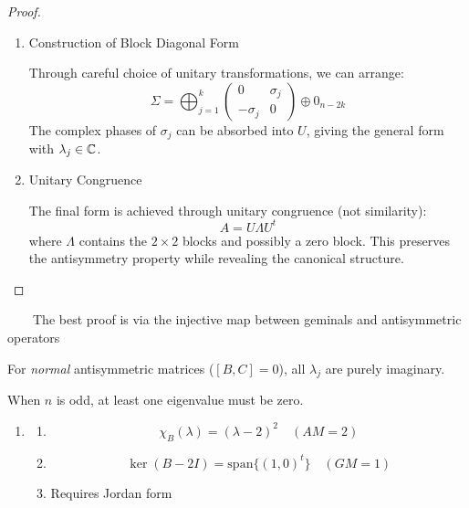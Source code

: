 \begin{theorem}
\begin{proof}
\begin{enumerate}
\item Construction of Block Diagonal Form

Through careful choice of unitary transformations, we can arrange: 
\begin{equation}
\Sigma =\bigoplus_{j=1}^{k}%
\begin{pmatrix}
0 & \sigma _{j} \\ 
-\sigma _{j} & 0%
\end{pmatrix}%
\oplus 0_{n-2k}
\end{equation}%
The complex phases of $\sigma _{j}$ can be absorbed into $U$, giving the
general form with $\lambda _{j}\in {\Bbb C}$.

\item Unitary Congruence

The final form is achieved through unitary congruence (not similarity): 
\begin{equation}
A=U\Lambda U^{t}
\end{equation}%
where $\Lambda $ contains the $2\times 2$ blocks and possibly a zero block.
This preserves the antisymmetry property while revealing the canonical
structure.
\end{enumerate}
\end{proof} $\qquad $The best proof is via the injective map between
geminals and antisymmetric operators
\end{theorem}

\begin{corollary}
For {\em normal} antisymmetric matrices ($[B,C]=0$), all $\lambda _{j}$ are
purely imaginary.
\end{corollary}

\begin{corollary}
When $n$ is odd, at least one eigenvalue must be zero.
\end{corollary}

\begin{enumerate}
\item 
\begin{enumerate}
\item 
\begin{equation}
\chi _{B}(\lambda )=(\lambda -2)^{2}\quad (AM=2)
\end{equation}

\item 
\begin{equation}
\ker (B-2I)=\text{span}\{(1,0)^{t}\}\quad (GM=1)
\end{equation}

\item Requires Jordan form
\end{enumerate}
\end{enumerate}

